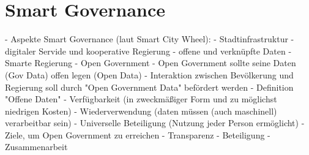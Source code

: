 \section{Smart Governance}





- Aspekte Smart Governance (laut Smart City Wheel):
  - Stadtinfrastruktur
  - digitaler Servide und kooperative Regierung
  - offene und verknüpfte Daten
  - Smarte Regierung
- Open Government
  - Open Government sollte seine Daten (Gov Data) offen legen (Open Data)
- Interaktion zwischen Bevölkerung und Regierung soll durch "Open Government Data" befördert werden
- Definition "Offene Daten"
  - Verfügbarkeit (in zweckmäßiger Form und zu möglichst niedrigen Kosten)
  - Wiederverwendung (daten müssen (auch maschinell) verarbeitbar sein)
  - Universelle Beteiligung (Nutzung jeder Person ermöglicht)
-  Ziele, um Open Government zu erreichen
  - Transparenz
  - Beteiligung
  - Zusammenarbeit
 
 \cite{Fuetterer.2020}